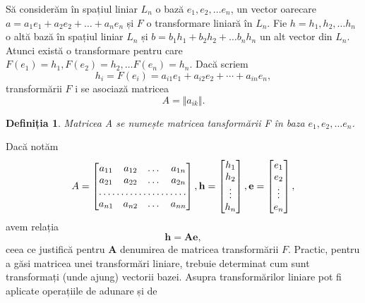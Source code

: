 Să considerăm în spațiul liniar $\mathit{L_{n}}$ o bază $e_{1}, e_{2}, \dots
e_{n}$, un vector oarecare $a = a_{1}e_{1} + a_{2}e_{2} + \dots + a_{n}e_{n}$
și $\mathit{F}$ o transformare liniară în $\mathit{L_{n}}$. Fie $h = h_{1},
h_{2}, \dots h_{n}$ o altă bază în spațiul liniar $\mathit{L_{n}}$ și 
$b = b_{1}h_{1} + b_{2}h_{2} + \dots b_{n}h_{n}$ un alt vector
din $\mathit{L_{n}}$.
Atunci există o transformare pentru care $F(e_{1}) =
h_{1}, F(e_{2}) = h_{2}, \dots F(e_{n}) = h_{n}$. Dacă scriem
\begin{equation}
h_{i} = F(e_{i}) = a_{i1}e_{1} + a_{i2}e_{2} + \cdots + a_{in}e_{n},
\end{equation} transformării $F$ i se asociază matricea 
\begin{equation}
A = \Vert a_{ik} \Vert.
\end{equation}
\newtheorem{th_lt_matrix}[theorem_liniar_space]{Definiția}
\begin{th_lt_matrix} 
Matricea A se numește
matricea tansformării F în baza $e_{1}, e_{2}, \dots e_{n}$.
\end{th_lt_matrix}
Dacă notăm 
\begin{equation*}
A =
\begin{bmatrix}
a_{11} & a_{12} & \dots & a_{1n} \\
a_{21} & a_{22} & \dots & a_{2n} \\
\hdotsfor{4} \\
a_{n1} & a_{n2} & \dots & a_{nn}
\end{bmatrix} ,
\mathbf{h} =
\begin{bmatrix}
h_{1} \\
h_{2} \\
\vdots \\
h_{n}
\end{bmatrix} ,
\mathbf{e} =
\begin{bmatrix}
e_{1} \\
e_{2} \\
\vdots \\
e_{n}
\end{bmatrix}, 
\end{equation*} avem relația
\begin{equation}
\mathbf{h} = \mathbf{Ae},
\end{equation} ceea ce justifică pentru $\mathbf{A}$ denumirea de matricea
transformării $\mathit{F}$.
Practic, pentru a găsi matricea unei transformări liniare, trebuie determinat
cum sunt transformați (unde ajung) vectorii bazei.
Asupra transformărilor liniare pot fi aplicate operațiile de adunare și de
